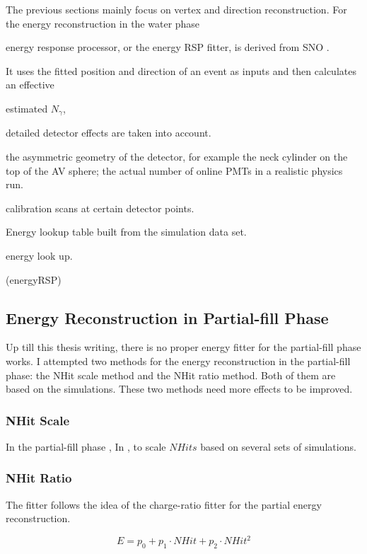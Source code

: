 The previous sections mainly focus on vertex and direction reconstruction. For the energy reconstruction in the water phase 

energy response processor, or the energy RSP fitter, is derived from SNO \cite{boulay2004direct,moffat2001optical}.

It uses the fitted position and direction of an event as inputs and then calculates an effective 

estimated $N_\gamma$,

detailed detector effects are taken into account.

the asymmetric geometry of the detector, for example the neck cylinder on the top of the AV sphere; the actual number of online PMTs in a realistic physics run.





 calibration scans at certain detector points.

Energy lookup table built from the simulation data set.



energy look up\cite{energyRSP}.

(energyRSP)
\subsection{Energy Reconstruction in Partial-fill Phase}
Up till this thesis writing, there is no proper energy fitter for the partial-fill phase works. I attempted two methods for the energy reconstruction in the partial-fill phase: the NHit scale method and the NHit ratio method. Both of them are based on the simulations. These two methods need more effects to be improved.
\subsubsection{NHit Scale}
In the partial-fill phase ,  In \cite{partialEnergy}, 
to scale $NHits$ based on several sets of simulations.

\subsubsection{NHit Ratio}


The fitter follows the idea of the charge-ratio fitter for the partial energy reconstruction\cite{partialEnergyYang}.

\begin{equation}
E = p_0+p_1\cdot NHit+p_2\cdot NHit^2
\end{equation}


